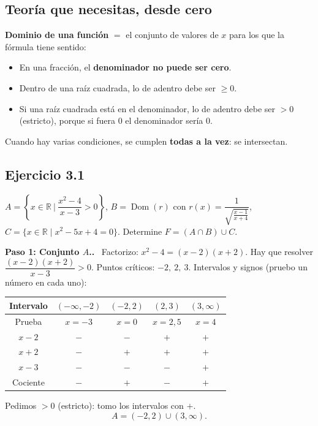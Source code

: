\documentclass[11pt,a4paper]{article}
\newcommand{\R}{\mathbb{R}}
\newcommand{\dom}{\operatorname{Dom}}
\newcommand{\paso}[1]{\par\medskip\noindent\textbf{\textcolor{blue!50!black}{Paso #1.}}\ }
\begin{document}
\subsection{Teoría que necesitas, desde cero}

\begin{idea}
\textbf{Dominio de una función} $=$ el conjunto de valores de $x$ para los que la fórmula tiene sentido:
\begin{itemize}[nosep]
  \item En una fracción, el \textbf{denominador no puede ser cero}.
  \item Dentro de una raíz cuadrada, lo de adentro debe ser $\ge0$.
  \item Si una raíz cuadrada está en el denominador, lo de adentro debe ser $>0$ (estricto), porque si fuera $0$ el denominador sería $0$.
\end{itemize}
Cuando hay varias condiciones, se cumplen \textbf{todas a la vez}: se intersectan.
\end{idea}

\subsection{Ejercicio 3.1}
\begin{enunciado}
$A=\left\{x\in\R\ \Big|\ \dfrac{x^2-4}{x-3}>0\right\}$, \quad
$B=\dom(r)$ con $r(x)=\dfrac1{\sqrt{\frac{x-1}{x+4}}}$, \quad
$C=\{x\in\R\mid x^2-5x+4=0\}$. Determine $F=(A\cap B)\cup C$.
\end{enunciado}

\paso{1: Conjunto $A$.} Factorizo: $x^2-4=(x-2)(x+2)$. Hay que resolver $\dfrac{(x-2)(x+2)}{x-3}>0$.
Puntos críticos: $-2,\ 2,\ 3$. Intervalos y signos (pruebo un número en cada uno):
\begin{center}
\begin{tabular}{c|cccc}
Intervalo & $(-\infty,-2)$ & $(-2,2)$ & $(2,3)$ & $(3,\infty)$\\ \hline
Prueba & $x=-3$ & $x=0$ & $x=2{,}5$ & $x=4$\\
$x-2$ & $-$ & $-$ & $+$ & $+$\\
$x+2$ & $-$ & $+$ & $+$ & $+$\\
$x-3$ & $-$ & $-$ & $-$ & $+$\\ \hline
Cociente & $-$ & $+$ & $-$ & $+$
\end{tabular}
\end{center}
Pedimos $>0$ (estricto): tomo los intervalos con $+$.
\[ A=(-2,2)\cup(3,\infty). \]
\end{document}
